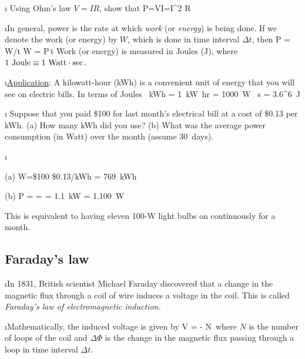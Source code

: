 \i \exer
Using Ohm's law $V=IR$, show that
%
\be
P=VI=I^2 R 
\ee

\i In general, power is the rate at which {\em work} (or {\em energy})
is  being done. 
If we denote the work (or energy) by $W$, which is done in 
time interval $\Delta t$, then
%
\be
P = W/\Delta t
\quad
W = P\,\Delta t
\ee
%
Work (or energy) is measured in Joules (J), where 
$1~{\rm Joule} \equiv 1~{\rm Watt}\cdot{\rm sec}$.

\i \underline{Application}: 
A kilowatt-hour (kWh) is a convenient unit of 
energy that you will see on electric bills.
In terms of Joules
%
~{\rm kWh}
= 1~{\rm kW}~{\rm hr}
= 1000~{\rm W} ~{\rm s}
= 3.6^6~{\rm J}
\ee

\i \exer 
Suppose that you paid \$100 for last month's electrical bill
at a cost of \$0.13 per kWh.
(a) How many kWh did you use? 
(b) What was the average power consumption (in Watt) over 
the month (assume 30~days).

\i \ans

(a) 
\be 
W=\$100 \div \$0.13/{\rm kWh} = 769~{\rm kWh}
\ee 

(b)
\be
P =  
=  
= 1.1~{\rm kW} 
= 1,100~{\rm W}
\ee

This is equivalent to having eleven 100-W light bulbs 
on continuously for a month.
 
\ei

%
\subsection{Faraday's law}

\bi

\i In  1831, British scientist Michael Faraday discovered 
that a change in the magnetic flux through a coil of wire 
induces a voltage in the coil.
This is called {\em Faraday's law of electromagnetic induction.}

\i Mathematically, the induced voltage is given by
%
\be
V = - N\,
\ee
%
where $N$ is the number of loops of the coil and $\Delta\Phi$ 
is the change in the magnetic flux 
passing through a loop in time interval $\Delta t$.

